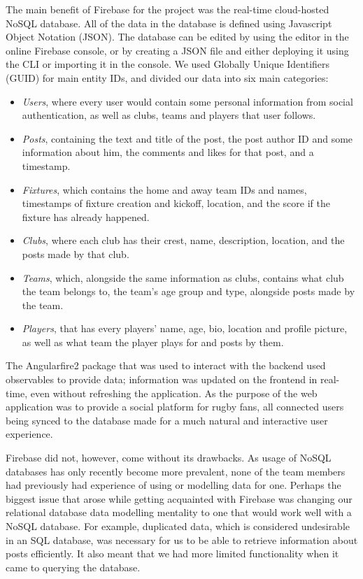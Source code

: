 \documentclass{l3proj}
\begin{document}
The main benefit of Firebase for the project was the real-time cloud-hosted
 NoSQL database. All of the data in the database is defined using Javascript
 Object Notation (JSON). The database can be edited by using the editor
 in the online Firebase console, or by creating a JSON file and either deploying
 it using the CLI or importing it in the console. We used Globally Unique
 Identifiers (GUID) for main entity IDs, and divided our data into six main categories:
\begin{itemize}
\item
\textit{Users}, where every user would contain some personal information
 from social authentication, as well as clubs, teams and players that user
 follows.

\item
\textit{Posts}, containing the text and title of the post, the post
 author ID and some information about him, the comments and likes for
 that post, and a timestamp.

\item
\textit{Fixtures}, which contains the home and away team IDs and names,
 timestamps of fixture creation and kickoff, location, and the score if
 the fixture has already happened.

\item
\textit{Clubs}, where each club has their crest, name, description,
location, and the posts made by that club.

\item
\textit{Teams}, which, alongside the same information as
clubs, contains what club the team belongs to, the team's age group and
type, alongside posts made by the team.

\item
\textit{Players}, that has every players' name, age, bio, location and
 profile picture, as well as what team the player plays for and posts
 by them.

\end{itemize}
The Angularfire2 package that was used to interact with the backend used
 observables to provide data; information was updated on the frontend in
 real-time, even without refreshing the application. As the purpose of the web
 application was to provide a social platform for rugby fans, all connected
 users being synced to the database made for a much natural and interactive
 user experience.



Firebase did not, however, come without its drawbacks. As usage of NoSQL
 databases has only recently become more prevalent, none of the team members
 had previously had experience of using or modelling data for one. Perhaps
 the biggest issue that arose while getting acquainted with Firebase was
 changing our relational database data modelling mentality to one that would work
 well with a NoSQL database. For example, duplicated data, which is considered
 undesirable in an SQL database, was necessary for us to be able to retrieve
 information about posts efficiently. It also meant that we had more limited
 functionality when it came to querying the database.
\end{document}
